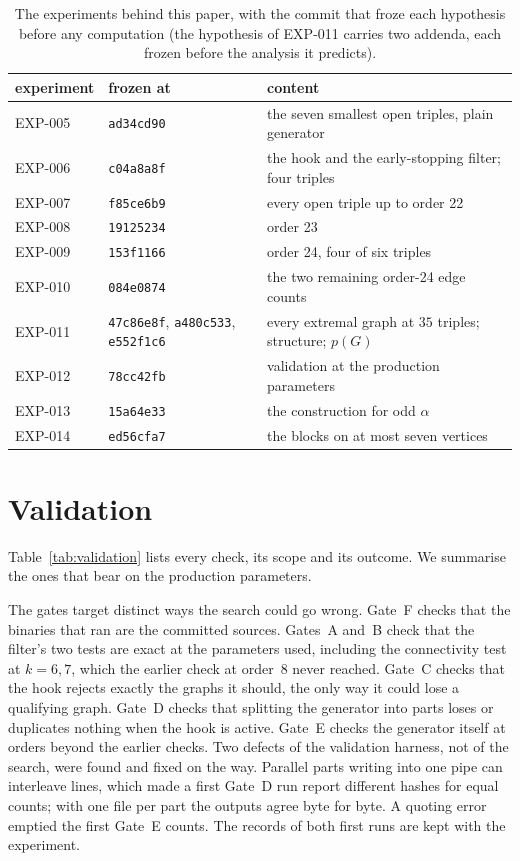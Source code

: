 \documentclass[11pt]{article}
\theoremstyle{definition}
\theoremstyle{remark}
\begin{document}
\begin{table}[t]
\centering\footnotesize
\caption{The experiments behind this paper, with the commit that froze each hypothesis before any computation (the
hypothesis of EXP-011 carries two addenda, each frozen before the analysis it predicts).}
\label{tab:exps}
\begin{tabular}{lll}
\toprule
experiment & frozen at & content \\
\midrule
EXP-005 & \texttt{ad34cd90} & the seven smallest open triples, plain generator \\
EXP-006 & \texttt{c04a8a8f} & the hook and the early-stopping filter; four triples \\
EXP-007 & \texttt{f85ce6b9} & every open triple up to order 22 \\
EXP-008 & \texttt{19125234} & order 23 \\
EXP-009 & \texttt{153f1166} & order 24, four of six triples \\
EXP-010 & \texttt{084e0874} & the two remaining order-24 edge counts \\
EXP-011 & \texttt{47c86e8f}, \texttt{a480c533}, \texttt{e552f1c6} & every extremal graph at $35$ triples; structure; $p(G)$ \\
EXP-012 & \texttt{78cc42fb} & validation at the production parameters \\
EXP-013 & \texttt{15a64e33} & the construction for odd $\alpha$ \\
EXP-014 & \texttt{ed56cfa7} & the blocks on at most seven vertices \\
\bottomrule
\end{tabular}
\end{table}

\section{Validation}\label{sec:validation}

Table~\ref{tab:validation} lists every check, its scope and its outcome. We summarise the ones that bear on the
production parameters.

The gates target distinct ways the search could go wrong. Gate~F checks that the binaries that ran are the committed
sources. Gates~A and~B check that the filter's two tests are exact at the parameters used, including the connectivity
test at $k=6,7$, which the earlier check at order~8 never reached. Gate~C checks that the hook rejects exactly the
graphs it should, the only way it could lose a qualifying graph. Gate~D checks that splitting the generator into
parts loses or duplicates nothing when the hook is active. Gate~E checks the generator itself at orders beyond the
earlier checks. Two defects of the validation harness, not of the search, were found and fixed on the way. Parallel
parts writing into one pipe can interleave lines, which made a first Gate~D run report different hashes for equal
counts; with one file per part the outputs agree byte for byte. A quoting error emptied the first Gate~E counts. The
records of both first runs are kept with the experiment.
\end{document}
